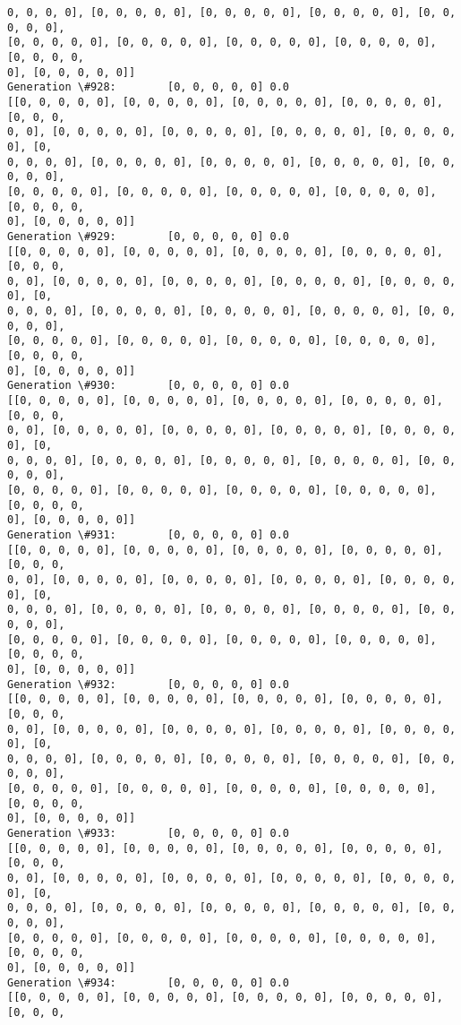 \documentclass[11pt]{article}
\begin{document}
\begin{Verbatim}[commandchars=\\\{\}]
0, 0, 0, 0], [0, 0, 0, 0, 0], [0, 0, 0, 0, 0], [0, 0, 0, 0, 0], [0, 0, 0, 0, 0],
[0, 0, 0, 0, 0], [0, 0, 0, 0, 0], [0, 0, 0, 0, 0], [0, 0, 0, 0, 0], [0, 0, 0, 0,
0], [0, 0, 0, 0, 0]]
Generation \#928:        [0, 0, 0, 0, 0] 0.0
[[0, 0, 0, 0, 0], [0, 0, 0, 0, 0], [0, 0, 0, 0, 0], [0, 0, 0, 0, 0], [0, 0, 0,
0, 0], [0, 0, 0, 0, 0], [0, 0, 0, 0, 0], [0, 0, 0, 0, 0], [0, 0, 0, 0, 0], [0,
0, 0, 0, 0], [0, 0, 0, 0, 0], [0, 0, 0, 0, 0], [0, 0, 0, 0, 0], [0, 0, 0, 0, 0],
[0, 0, 0, 0, 0], [0, 0, 0, 0, 0], [0, 0, 0, 0, 0], [0, 0, 0, 0, 0], [0, 0, 0, 0,
0], [0, 0, 0, 0, 0]]
Generation \#929:        [0, 0, 0, 0, 0] 0.0
[[0, 0, 0, 0, 0], [0, 0, 0, 0, 0], [0, 0, 0, 0, 0], [0, 0, 0, 0, 0], [0, 0, 0,
0, 0], [0, 0, 0, 0, 0], [0, 0, 0, 0, 0], [0, 0, 0, 0, 0], [0, 0, 0, 0, 0], [0,
0, 0, 0, 0], [0, 0, 0, 0, 0], [0, 0, 0, 0, 0], [0, 0, 0, 0, 0], [0, 0, 0, 0, 0],
[0, 0, 0, 0, 0], [0, 0, 0, 0, 0], [0, 0, 0, 0, 0], [0, 0, 0, 0, 0], [0, 0, 0, 0,
0], [0, 0, 0, 0, 0]]
Generation \#930:        [0, 0, 0, 0, 0] 0.0
[[0, 0, 0, 0, 0], [0, 0, 0, 0, 0], [0, 0, 0, 0, 0], [0, 0, 0, 0, 0], [0, 0, 0,
0, 0], [0, 0, 0, 0, 0], [0, 0, 0, 0, 0], [0, 0, 0, 0, 0], [0, 0, 0, 0, 0], [0,
0, 0, 0, 0], [0, 0, 0, 0, 0], [0, 0, 0, 0, 0], [0, 0, 0, 0, 0], [0, 0, 0, 0, 0],
[0, 0, 0, 0, 0], [0, 0, 0, 0, 0], [0, 0, 0, 0, 0], [0, 0, 0, 0, 0], [0, 0, 0, 0,
0], [0, 0, 0, 0, 0]]
Generation \#931:        [0, 0, 0, 0, 0] 0.0
[[0, 0, 0, 0, 0], [0, 0, 0, 0, 0], [0, 0, 0, 0, 0], [0, 0, 0, 0, 0], [0, 0, 0,
0, 0], [0, 0, 0, 0, 0], [0, 0, 0, 0, 0], [0, 0, 0, 0, 0], [0, 0, 0, 0, 0], [0,
0, 0, 0, 0], [0, 0, 0, 0, 0], [0, 0, 0, 0, 0], [0, 0, 0, 0, 0], [0, 0, 0, 0, 0],
[0, 0, 0, 0, 0], [0, 0, 0, 0, 0], [0, 0, 0, 0, 0], [0, 0, 0, 0, 0], [0, 0, 0, 0,
0], [0, 0, 0, 0, 0]]
Generation \#932:        [0, 0, 0, 0, 0] 0.0
[[0, 0, 0, 0, 0], [0, 0, 0, 0, 0], [0, 0, 0, 0, 0], [0, 0, 0, 0, 0], [0, 0, 0,
0, 0], [0, 0, 0, 0, 0], [0, 0, 0, 0, 0], [0, 0, 0, 0, 0], [0, 0, 0, 0, 0], [0,
0, 0, 0, 0], [0, 0, 0, 0, 0], [0, 0, 0, 0, 0], [0, 0, 0, 0, 0], [0, 0, 0, 0, 0],
[0, 0, 0, 0, 0], [0, 0, 0, 0, 0], [0, 0, 0, 0, 0], [0, 0, 0, 0, 0], [0, 0, 0, 0,
0], [0, 0, 0, 0, 0]]
Generation \#933:        [0, 0, 0, 0, 0] 0.0
[[0, 0, 0, 0, 0], [0, 0, 0, 0, 0], [0, 0, 0, 0, 0], [0, 0, 0, 0, 0], [0, 0, 0,
0, 0], [0, 0, 0, 0, 0], [0, 0, 0, 0, 0], [0, 0, 0, 0, 0], [0, 0, 0, 0, 0], [0,
0, 0, 0, 0], [0, 0, 0, 0, 0], [0, 0, 0, 0, 0], [0, 0, 0, 0, 0], [0, 0, 0, 0, 0],
[0, 0, 0, 0, 0], [0, 0, 0, 0, 0], [0, 0, 0, 0, 0], [0, 0, 0, 0, 0], [0, 0, 0, 0,
0], [0, 0, 0, 0, 0]]
Generation \#934:        [0, 0, 0, 0, 0] 0.0
[[0, 0, 0, 0, 0], [0, 0, 0, 0, 0], [0, 0, 0, 0, 0], [0, 0, 0, 0, 0], [0, 0, 0,

\end{Verbatim}
\end{document}
